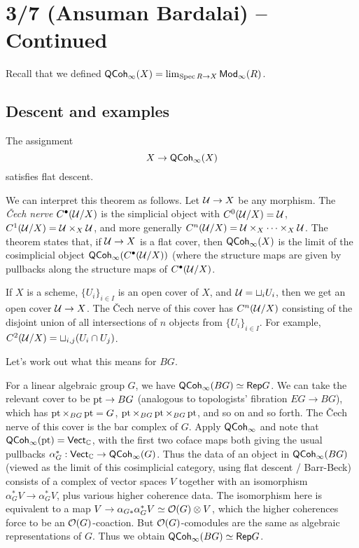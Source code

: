 \documentclass{article}
\begin{document}
\section{3/7 (Ansuman Bardalai) -- Continued}

Recall that we defined $\mathsf{QCoh}_\infty(X) = \lim_{\operatorname{Spec} R \to X} \mathsf{Mod}_\infty(R)$.

\subsection{Descent and examples}

\begin{thm}
	The assignment
	\[
		X \to \mathsf{QCoh}_\infty(X)
	\]
	satisfies flat descent.
\end{thm}

We can interpret this theorem as follows.
Let $\mathcal{U} \to X$ be any morphism.
The \emph{\v{C}ech nerve} $C^\bullet(\mathcal{U}/X)$ is the simplicial object with $C^0(\mathcal{U}/X) = \mathcal{U}$, $C^1(\mathcal{U}/X) = \mathcal{U} \times_X \mathcal{U}$, and more generally $C^n(\mathcal{U}/X) = \mathcal{U} \times_X \dots \times_X \mathcal{U}$.
The theorem states that, if $\mathcal{U} \to X$ is a flat cover, then $\mathsf{QCoh}_\infty(X)$ is the limit of the cosimplicial object $\mathsf{QCoh}_\infty(C^\bullet(\mathcal{U}/X))$ (where the structure maps are given by pullbacks along the structure maps of $C^\bullet(\mathcal{U}/X)$.

\begin{ex}
	If $X$ is a scheme, $\{ U_i \}_{i \in I}$ is an open cover of $X$, and $\mathcal{U} = \sqcup_i U_i$, then we get an open cover $\mathcal{U} \to X$.
	The \v{C}ech nerve of this cover has $C^n(\mathcal{U}/X)$ consisting of the disjoint union of all intersections of $n$ objects from $\{ U_i \}_{i \in I}$.
	For example, $C^2(\mathcal{U}/X) = \sqcup_{i,j} (U_i \cap U_j)$.
\end{ex}

Let's work out what this means for $BG$.

\begin{ex}
	For a linear algebraic group $G$, we have $\mathsf{QCoh}_\infty(BG) \simeq \mathsf{Rep} G$.
	We can take the relevant cover to be $\operatorname{pt} \to BG$ (analogous to topologists' fibration $EG \to BG$), which has $\operatorname{pt} \times_{BG} \operatorname{pt} = G$, $\operatorname{pt} \times_{BG} \operatorname{pt} \times_{BG} \operatorname{pt}$, and so on and so forth.
	The \v{C}ech nerve of this cover is the bar complex of $G$.
	Apply $\mathsf{QCoh}_\infty$ and note that $\mathsf{QCoh}_\infty(\operatorname{pt}) = \mathsf{Vect}_{\mathbb{C}}$, with the first two coface maps both giving the usual pullbacks $\alpha_G^*: \mathsf{Vect}_{\mathbb{C}} \to \mathsf{QCoh}_\infty(G)$.
	Thus the data of an object in $\mathsf{QCoh}_\infty(BG)$ (viewed as the limit of this cosimplicial category, using flat descent / Barr-Beck) consists of a complex of vector spaces $V$ together with an isomorphism $\alpha_G^* V \to \alpha_G^* V$, plus various higher coherence data.
	The isomorphism here is equivalent to a map $V \to \alpha_{G*} \alpha_G^* V \simeq \mathcal{O}(G) \otimes V$, which the higher coherences force to be an $\mathcal{O}(G)$-coaction.
	But $\mathcal{O}(G)$-comodules are the same as algebraic representations of $G$.
	Thus we obtain $\mathsf{QCoh}_\infty(BG) \simeq \mathsf{Rep} G$.
\end{ex}
\end{document}
